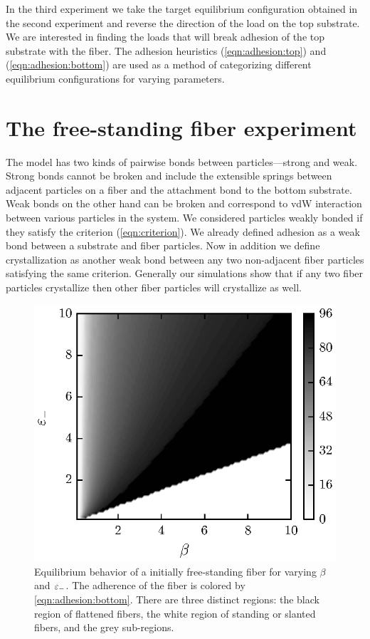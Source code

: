 In the third experiment we take the target equilibrium configuration obtained in the second experiment and reverse the direction of the load on the top substrate. We are interested in finding the loads that will break adhesion of the top substrate with the fiber. The adhesion heuristics (\ref{eqn:adhesion:top}) and (\ref{eqn:adhesion:bottom}) are used as a method of categorizing different equilibrium configurations for varying parameters.

\section{The free-standing fiber experiment}

The model has two kinds of pairwise bonds between particles---strong and weak. Strong bonds cannot be broken and include the extensible springs between adjacent particles on a fiber and the attachment bond to the bottom substrate. Weak bonds on the other hand can be broken and correspond to vdW interaction between various particles in the system. We considered particles weakly bonded if they satisfy the criterion (\ref{eqn:criterion}). We already defined adhesion as a weak bond between a substrate and fiber particles. Now in addition we define crystallization as another weak bond between any two non-adjacent fiber particles satisfying the same criterion. Generally our simulations show that if any two fiber particles crystallize then other fiber particles will crystallize as well.

	\begin{figure}[ht!]
		\begin{center}
			\includegraphics{./fig/ch3/fs/grid.eps}
		\end{center}		
		\caption{Equilibrium behavior of a initially free-standing fiber for varying $\beta$ and $\varepsilon_-$. The adherence of the fiber is colored by \ref{eqn:adhesion:bottom}. There are three distinct regions: the black region of flattened fibers, the white region of standing or slanted fibers, and the grey sub-regions.
		\label{fig:fs}}
	\end{figure}

